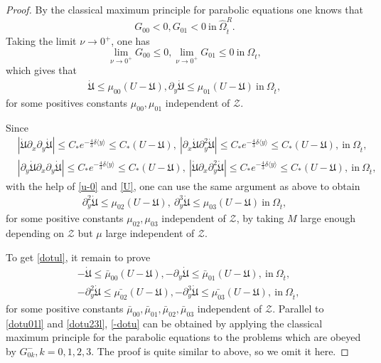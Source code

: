 \documentclass{amsart}
\numberwithin{equation}{section}
\newcommand\y{{{\langle y \rangle}}}
\begin{document}
\begin{proof}
By the classical maximum principle for parabolic equations one knows that
$$G_{00}<0,G_{01}<0 ~\text{in}~\hat{\Omega}_{\hat{t}}^{R}.$$
Taking the limit $\nu\to 0^{+}$, one has
$$\lim\limits_{\nu\to 0^{+}}G_{00}\leq 0, \lim\limits_{\nu\to 0^{+}}G_{01}\leq 0 ~\text{in}~\Omega_{\hat{t}},$$
which gives that
\begin{align}\label{dotu01l}
\dot{\mathfrak{U}}\leq \mu_{00}(U-\mathfrak{U}), \partial_{y}\dot{\mathfrak{U}}\leq \mu_{01}(U-\mathfrak{U})~\text{in}~\Omega_{\hat{t}},
\end{align}
for some positives constants $\mu_{00},\mu_{01}$ independent of $\mathcal{Z}$.

Since
\begin{align*}
&|\dot{\mathfrak{U}}\partial_{x}\partial_{y}\dot{\mathfrak{U}}|\leq C_{*}e^{-\frac{4}{3}\delta\y}\leq C_{*}(U-\mathfrak{U}),~
 |\partial_{x}\dot{\mathfrak{U}}\partial_{y}^{2}\dot{\mathfrak{U}}|\leq C_{*}e^{-\frac{4}{3}\delta\y}\leq C_{*}(U-\mathfrak{U}), ~\text{in}~\Omega_{\hat{t}},\\
&|\partial_{y}\dot{\mathfrak{U}}\partial_{x}\partial_{y}\dot{\mathfrak{U}}|\leq C_{*}e^{-\frac{4}{3}\delta\y}\leq C_{*}(U-\mathfrak{U}),~
 |\dot{\mathfrak{U}}\partial_{x}\partial_{y}^{2}\dot{\mathfrak{U}}|\leq C_{*}e^{-\frac{4}{3}\delta\y}
 \leq C_{*}(U-\mathfrak{U}),~\text{in}~\Omega_{\hat{t}},
\end{align*}
with the help of \eqref{u-0} and \eqref{U}, one can use the same argument as above to obtain
\begin{align}\label{dotu23l}
\partial_{y}^{2}\dot{\mathfrak{U}}\leq \mu_{02}(U-\mathfrak{U}),~
\partial_{y}^{3}\dot{\mathfrak{U}}\leq \mu_{03}(U-\mathfrak{U})~\text{in}~\Omega_{\hat{t}},
\end{align}
for some positive constants $\mu_{02},\mu_{03}$ independent of $\mathcal{Z}$, by taking $M$ large enough depending on $\mathcal{Z}$ but $\mu$ large independent of $\mathcal{Z}$.

To get \eqref{dotul}, it remain to prove
\begin{align}\label{-dotu}
&-\dot{\mathfrak{U}}\leq \bar{\mu}_{00}(U-\mathfrak{U}),
 -\partial_{y}\dot{\mathfrak{U}}\leq \bar{\mu}_{01}(U-\mathfrak{U}),~\text{in}~\Omega_{\hat{t}},\\
&-\partial_{y}^{2}\dot{\mathfrak{U}}\leq \bar{\mu_{02}}(U-\mathfrak{U}),
 -\partial_{y}^{3}\dot{\mathfrak{U}}\leq \bar{\mu_{03}}(U-\mathfrak{U}),~\text{in}~\Omega_{\hat{t}},\nonumber
\end{align}
for some positive constants $\bar{\mu}_{00},\bar{\mu}_{01},\bar{\mu}_{02},\bar{\mu}_{03}$ independent of $\mathcal{Z}$. Parallel to \eqref{dotu01l} and \eqref{dotu23l}, \eqref{-dotu} can be obtained by applying the classical maximum principle for the parabolic equations to the problems which are obeyed by $G_{0k}^{-}, k=0,1,2,3$. The proof is quite similar to above, so we omit it here.


\end{proof}
\end{document}
